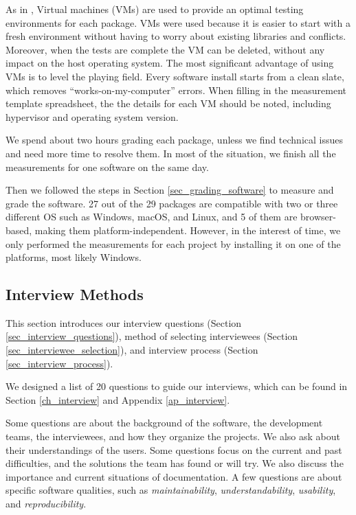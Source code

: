 \documentclass[3p, 12pt,authoryear]{elsarticle}
\begin{document}
As in \citet{SmithEtAl2016}, Virtual machines (VMs) are used to provide an
optimal testing environments for each package. VMs were used because it is
easier to start with a fresh environment without having to worry about existing
libraries and conflicts. Moreover, when the tests are complete the VM can be
deleted, without any impact on the host operating system. The most significant
advantage of using VMs is to level the playing field. Every software install
starts from a clean slate, which removes ``works-on-my-computer'' errors. When
filling in the measurement template spreadsheet, the the details for each VM
should be noted, including hypervisor and operating system version.

We spend about two hours grading each package, unless we find technical issues
and need more time to resolve them. In most of the situation, we finish all the
measurements for one software on the same day.

Then we followed the steps in Section \ref{sec_grading_software} to measure and
grade the software. 27 out of the 29 packages are compatible with two or three
different OS such as Windows, macOS, and Linux, and 5 of them are browser-based,
making them platform-independent. However, in the interest of time, we only
performed the measurements for each project by installing it on one of the
platforms, most likely Windows.

\subsection{Interview Methods} \label{sec_interview_methods}

This section introduces our interview questions (Section
\ref{sec_interview_questions}), method of selecting interviewees (Section
\ref{sec_interviewee_selection}), and interview process (Section
\ref{sec_interview_process}).

We designed a list of 20 questions to guide our interviews, which can be found
in Section \ref{ch_interview} and Appendix \ref{ap_interview}.

Some questions are about the background of the software, the development teams,
the interviewees, and how they organize the projects. We also ask about their
understandings of the users. Some questions focus on the current and past
difficulties, and the solutions the team has found or will try. We also discuss
the importance and current situations of documentation. A few questions are
about specific software qualities, such as \textit{maintainability},
\textit{understandability}, \textit{usability}, and \textit{reproducibility}.
\end{document}
